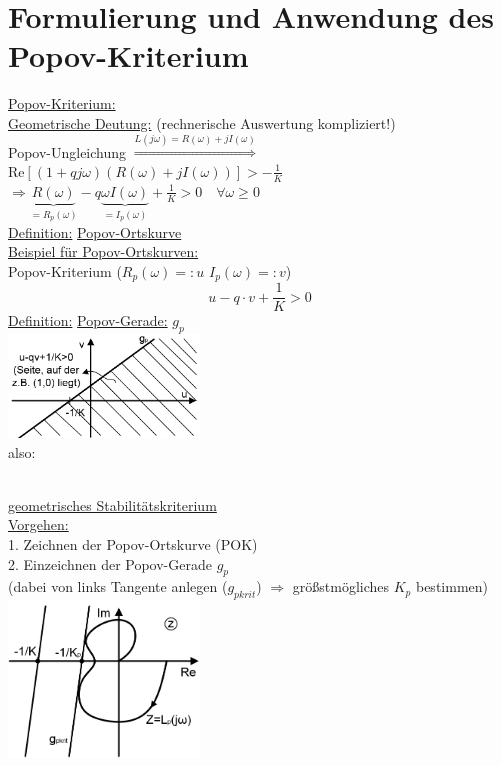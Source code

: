 \documentclass[openany,a4paper,11pt]{book}
\begin{document}
\section[Popov-Kriterium]{Formulierung und Anwendung des Popov-Kriterium}
\uline{Popov-Kriterium:}  \\
\uline{Geometrische Deutung:} (rechnerische Auswertung kompliziert!)\\
Popov-Ungleichung $\stackrel{L(j\omega)=R(\omega)+jI(\omega)}{\Rightarrow} $\\
Re$[(1+qj\omega)(R(\omega)+jI(\omega))]>-\frac{1}{K}$\\
$\Rightarrow \underbrace{ R(\omega) }_{=R_p(\omega)}-q \underbrace{\omega I(\omega)}_{=I_p(\omega)}+\frac{1}{K}>0 \quad \forall \omega \ge 0$\\
\uline{Definition:} \uline{Popov-Ortskurve} \\
\uline{Beispiel für Popov-Ortskurven:}  \\
Popov-Kriterium ($R_p(\omega)=:u$ $I_p(\omega)=:v$)
\[u-q\cdot v+\frac{1}{K}>0\]
\uline{Definition:}  \quad \uline{Popov-Gerade:} $g_p$\\
\includegraphics[width=2in]{imgs/NLR67.png}\\
also:\\
\begin{minipage}[c]{\textwidth}
\end{minipage}\\
\uline{geometrisches Stabilitätskriterium}\\
\uline{Vorgehen:}\\
1. Zeichnen der Popov-Ortskurve (POK)\\
2. Einzeichnen der Popov-Gerade $g_p$\\
(dabei von links Tangente anlegen ($g_{pkrit}$) $\Rightarrow$ größstmögliches $K_p$ bestimmen)\\
\includegraphics[width=2in]{imgs/NLR68.png}\\
\end{document}
